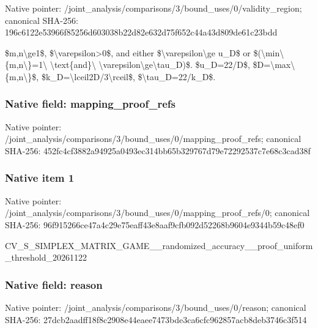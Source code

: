 \documentclass[10pt,a4paper]{article}
\begin{document}
Native pointer: /joint\_analysis/comparis\allowbreak{}ons/3/bound\_uses/0/valid\allowbreak{}ity\_region; canonical SHA-256: 196c6122e53966f85256d603\allowbreak{}038b22d82e632d75f652c44a\allowbreak{}43d809de61c23bdd


\$m,n\textbackslash{}ge1\$, \$\textbackslash{}varepsilon>0\$, and either \$\textbackslash{}varepsilon\textbackslash{}ge u\_D\$ or \$(\textbackslash{}min\textbackslash{}\{m,n\textbackslash{}\}=1\textbackslash{} \textbackslash{}text\{and\}\textbackslash{} \textbackslash{}varepsilon\textbackslash{}ge\textbackslash{}tau\_D)\$. \$u\_D=22/D\$, \$D=\textbackslash{}max\textbackslash{}\{m,n\textbackslash{}\}\$, \$k\_D=\textbackslash{}lceil2D/3\textbackslash{}rceil\$, \$\textbackslash{}tau\_D=22/k\_D\$.


\subsubsection{Native field: mapping\_proof\_refs}


Native pointer: /joint\_analysis/comparis\allowbreak{}ons/3/bound\_uses/0/mappi\allowbreak{}ng\_proof\_refs; canonical SHA-256: 452fc4cf3882a94925a0493e\allowbreak{}c314bb65b329767d79e72292\allowbreak{}537c7e68c3cad38f



\subsubsection{Native item 1}


Native pointer: /joint\_analysis/comparis\allowbreak{}ons/3/bound\_uses/0/mappi\allowbreak{}ng\_proof\_refs/0; canonical SHA-256: 96f915266ce47a4c29e75eaf\allowbreak{}f43e8aaf9cfb092d52268b96\allowbreak{}04e9344b59c48ef0


CV\_S\_SIMPLEX\_MATRIX\_GAME\allowbreak{}\_\_randomized\_accuracy\_\_p\allowbreak{}roof\_uniform\_threshold\_2\allowbreak{}0261122


\subsubsection{Native field: reason}


Native pointer: /joint\_analysis/comparis\allowbreak{}ons/3/bound\_uses/0/reaso\allowbreak{}n; canonical SHA-256: 27dcb2aadff18f8c2908e44e\allowbreak{}aee7473bde3ca6cfc962857a\allowbreak{}cb8deb3746c3f514
\end{document}
